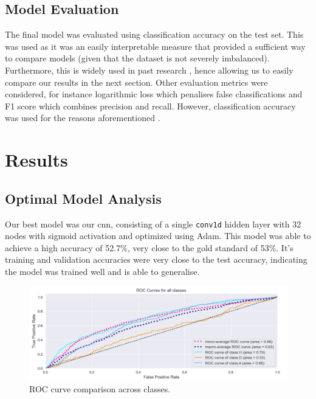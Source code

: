 \documentclass{article}
\newcommand{\sw}[1]{\texttt{#1}}
\begin{document}
\vspace{-0.5em}
\subsection{Model Evaluation}
\label{modeleval}

The final model was evaluated using classification accuracy on the test set. This was used as it was an easily interpretable measure that provided a sufficient way to compare models (given that the dataset is not severely imbalanced). Furthermore, this is widely used in past research \cite{horvat2020use}, hence allowing us to easily compare our results in the next section. Other evaluation metrics were considered, for instance logarithmic loss which penalises false classifications and F1 score which combines precision and recall. However, classification accuracy was used for the reasons aforementioned \cite{mishramediummetrics}. 

\vspace{-1em}
\section{Results}
\label{results}

\vspace{-0.5em}
\subsection{Optimal Model Analysis}
\label{optimalmodel}

Our best model was our \gls{cnn}, consisting of a single \sw{conv1d} hidden layer with 32 nodes with sigmoid activation and optimized using Adam. This model was able to achieve a high accuracy of 52.7\%, very close to the gold standard of 53\%. It's training and validation accuracies were very close to the test accuracy, indicating the model was trained well and is able to generalise.

\vspace{-1em}
\begin{figure}[!htb]
    \centering
    \includegraphics[width=0.9\linewidth]{Images/Figure 4.jpeg}
    \caption{ROC curve comparison across classes.}
    \label{fig:ROC}
\end{figure}
\end{document}
